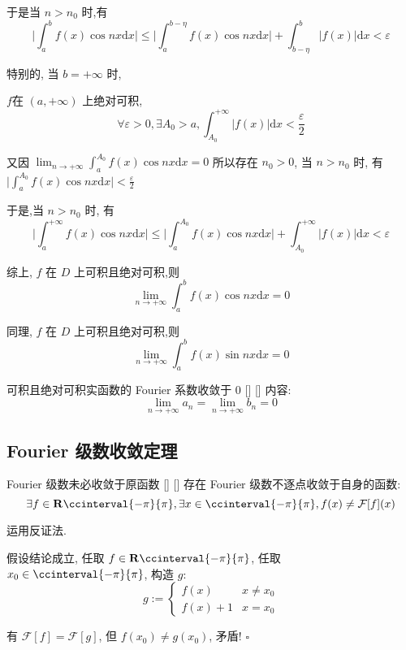 \documentclass[UTF8]{ctexart}
\begin{document}
\begin{prf}
				于是当 \(n>n_0\) 时,有
				\[\Bigg\vert\int_a^bf(x)\cos nx\mathrm{d}x\Bigg\vert\leqslant\Bigg\vert\int_a^{b-\eta}f(x)\cos nx\mathrm{d}x\Bigg\vert+\int_{b-\eta}^b|f(x)|\mathrm{d}x<\varepsilon\]
				
				特别的, 当 \(b=+\infty\) 时, 
				
				\(f\)在 \((a,+\infty)\) 上绝对可积, 
				\[\forall\varepsilon>0, \exists A_0>a, \int_{A_0}^{+\infty}|f(x)|\mathrm{d}x<\frac{\varepsilon}{2}\]
				
				又因 \(\lim_{n\to+\infty}\int_a^{A_0}f(x)\cos nx\mathrm{d}x=0\) 所以存在 \(n_0>0\), 当 \(n>n_0\) 时, 有\(\Bigg\vert\int_a^{A_0}f(x)\cos nx\mathrm{d}x\Bigg\vert<\frac{\varepsilon}{2}\)
				
				于是,当 \(n>n_0\) 时, 有
				\[\Bigg\vert\int_a^{+\infty}f(x)\cos nx\mathrm{d}x\Bigg\vert\leqslant\Bigg\vert\int_a^{A_0}f(x)\cos nx\mathrm{d}x\Bigg\vert+\int_{A_0}^{+\infty}|f(x)|\mathrm{d}x<\varepsilon\]
				
				综上,  \(f\) 在 \(D\) 上可积且绝对可积,则
				\[\lim_{n\to+\infty}\int_{a}^{b}f(x)\cos nx\text{d}x=0\]
				
				同理,  \(f\) 在 \(D\) 上可积且绝对可积,则
				\[\lim_{n\to+\infty}\int_{a}^{b}f(x)\sin nx\text{d}x=0\]
			\end{prf}

			\begin{crl}
			    []
			    {可积且绝对可积实函数的 Fourier 系数收敛于 0}
			    []
			    []
				内容: 
				\[\lim_{n\to+\infty}a_n=\lim_{n\to+\infty}b_n=0\]
			\end{crl}

		\subsection{Fourier 级数收敛定理}

			\begin{cxmp}
			    []
			    {Fourier 级数未必收敛于原函数}
			    []
			    []
				存在 Fourier 级数不逐点收敛于自身的函数: 
				\[\exists f\in\mathbf{R}\ccinterval{-\pi}{\pi}, \exists x\in\ccinterval{-\pi}{\pi}, f(x)\neq\mathcal{F}[f](x)\]
			\end{cxmp}

			\begin{prf}
				运用反证法. 

				假设结论成立, 任取 \(f\in\mathbf{R}\ccinterval{-\pi}{\pi}\), 任取 \(x_0\in\ccinterval{-\pi}{\pi}\), 构造 \(g\): 
				\[g:=
				\begin{cases}
					f(x) & x\neq x_0\\
					f(x)+1 & x = x_0
				\end{cases}\]

				有 \(\mathcal{F}[f]=\mathcal{F}[g]\), 但 \(f(x_0)\neq g(x_0)\), 矛盾! \(\square\)
			\end{prf}
\end{document}
